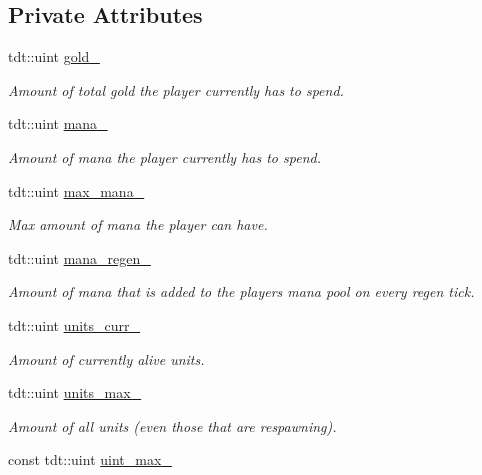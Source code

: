 \subsection*{Private Attributes}
\begin{DoxyCompactItemize}
\item 
tdt\+::uint \hyperlink{class_player_a283e4006215fba426896111688a433b9}{gold\+\_\+}
\begin{DoxyCompactList}\small\item\em Amount of total gold the player currently has to spend. \end{DoxyCompactList}\item 
tdt\+::uint \hyperlink{class_player_aa59cef1b9d820c0236dae21c3515e403}{mana\+\_\+}
\begin{DoxyCompactList}\small\item\em Amount of mana the player currently has to spend. \end{DoxyCompactList}\item 
tdt\+::uint \hyperlink{class_player_a7b04d40a9b9f4fd3e81e7cbfb4c80086}{max\+\_\+mana\+\_\+}
\begin{DoxyCompactList}\small\item\em Max amount of mana the player can have. \end{DoxyCompactList}\item 
tdt\+::uint \hyperlink{class_player_a02e019111b5750e3162ae0e288d3df67}{mana\+\_\+regen\+\_\+}
\begin{DoxyCompactList}\small\item\em Amount of mana that is added to the player\textquotesingle{}s mana pool on every regen tick. \end{DoxyCompactList}\item 
tdt\+::uint \hyperlink{class_player_a4c750f1435dd4ba8b5b56808c8a3d6ab}{units\+\_\+curr\+\_\+}
\begin{DoxyCompactList}\small\item\em Amount of currently alive units. \end{DoxyCompactList}\item 
tdt\+::uint \hyperlink{class_player_ab2ec319cec814bef14e5441377786862}{units\+\_\+max\+\_\+}
\begin{DoxyCompactList}\small\item\em Amount of all units (even those that are respawning). \end{DoxyCompactList}\item 
const tdt\+::uint \hyperlink{class_player_ab9f981851bd34dbb6afcefb97085764f}{uint\+\_\+max\+\_\+}

\end{DoxyCompactItemize}
